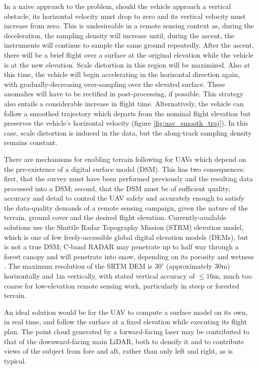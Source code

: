 \documentclass[10pt]{report}
\begin{document}
In a naive approach to the problem, should the vehicle approach a vertical obstacle, its horizontal velocity must drop to zero and its vertical velocity must increase from zero. This is undesireable in a remote sensing context as, during the deceleration, the sampling density will increase until, during the ascent, the instruments will continue to sample the same ground repeatedly. After the ascent, there will be a brief flight over a surface at the original elevation while the vehicle is at the new elevation. Scale distortion in this region will be maximized. Also at this time, the vehicle will begin accelerating in the horizontal direction again, with gradually-decreasing over-sampling over the elevated surface. These anomalies will have to be rectified in post-processing, if possible. This strategy also entails a considerable increase in flight time. Alternatively, the vehicle can follow a smoothed trajectory which departs from the nominal flight elevation but preserves the vehicle's horizontal velocity (figure \ref{fig:uav_smooth_traj}). In this case, scale distortion is induced in the data, but the along-track sampling density remains constant.

There are mechanisms for enabling terrain following for UAVs which depend on the pre-existence of a digital surface model (DSM). This has two consequences: first, that the survey must have been performed previously and the resulting data processed into a DSM; second, that the DSM must be of sufficient quality, accuracy and detail to control the UAV safely and accurately enough to satisfy the data-quality demands of a remote sensing campaign, given the nature of the terrain, ground cover and the desired flight elevation. Currently-available solutions use the Shuttle Radar Topography Mission (STRM) elevation model, which is one of few freely-accessible global digital elevation models (DEMs), but is not a true DSM; C-band RADAR may penetrate up to half way through a forest canopy \cite{Carabajal2005} and will penetrate into snow, depending on its porosity and wetness \cite{Tighe2009}. The maximum resolution of the SRTM DEM is $30'$ (approximately $30\si{\m}$) horizontally and $1\si{\m}$ vertically, with stated vertical accuracy of $\leq16\si{\m}$, much too coarse for low-elevation remote sensing work, particularly in steep or forested terrain.

An ideal solution would be for the UAV to compute a surface model on its own, in real time, and follow the surface at a fixed elevation while executing its flight plan. The point cloud generated by a forward-facing laser may be contributed to that of the downward-facing main LiDAR, both to densify it and to contribute views of the subject from fore and aft, rather than only left and right, as is typical. 
\end{document}
